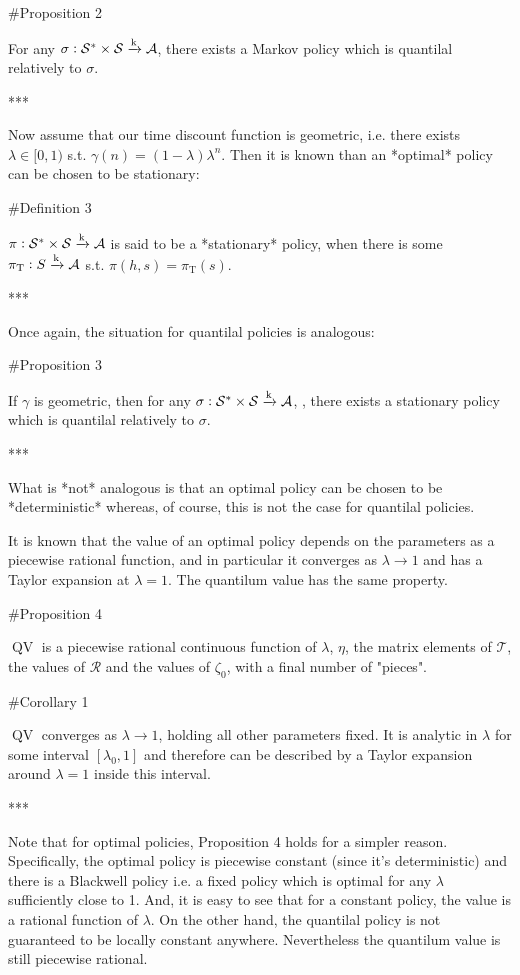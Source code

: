 \documentclass[a4paper]{article}
\newcommand{\AP}[1]{\left(#1\right)}
\newcommand{\AB}[1]{\left[#1\right]}
\newcommand{\K}{\xrightarrow{\textnormal{k}}}
\newcommand{\A}{\mathcal{A}}
\newcommand{\St}{\mathcal{S}}
\newcommand{\T}{\mathcal{T}}
\newcommand{\R}{\mathcal{R}}
\newcommand{\QV}{\operatorname{QV}}
\begin{document}
\#Proposition 2

For any $\sigma: \St^* \times \St \K \A$, there exists a Markov policy which is quantilal relatively to $\sigma$.

***

Now assume that our time discount function is geometric, i.e. there exists $\lambda\in[0,1)$ s.t. $\gamma(n)=(1-\lambda)\lambda^n$. Then it is known than an *optimal* policy can be chosen to be stationary:

\#Definition 3

$\pi: \St^* \times \St \K \A$ is said to be a *stationary* policy, when there is some $\pi_\text{T}: S \K \A$ s.t. $\pi(h,s)=\pi_\text{T}\AP{s}$.

***

Once again, the situation for quantilal policies is analogous:

\#Proposition 3

If $\gamma$ is geometric, then for any $\sigma: \St^* \times \St \K \A$, , there exists a stationary policy which is quantilal relatively to $\sigma$.

***

What is *not* analogous is that an optimal policy can be chosen to be *deterministic* whereas, of course, this is not the case for quantilal policies.

It is known that the value of an optimal policy depends on the parameters as a piecewise rational function, and in particular it converges as $\lambda \rightarrow 1$ and has a Taylor expansion at $\lambda=1$. The quantilum value has the same property.

\#Proposition 4

$\QV$ is a piecewise rational continuous function of $\lambda$, $\eta$, the matrix elements of $\T$, the values of $\R$ and the values of $\zeta_0$, with a final number of "pieces".

\#Corollary 1

$\QV$ converges as $\lambda \rightarrow 1$, holding all other parameters fixed. It is analytic in $\lambda$ for some interval $\AB{\lambda_0,1}$ and therefore can be described by a Taylor expansion around $\lambda=1$ inside this interval.

***

Note that for optimal policies, Proposition 4 holds for a simpler reason. Specifically, the optimal policy is piecewise constant (since it's deterministic) and there is a Blackwell policy i.e. a fixed policy which is optimal for any $\lambda$ sufficiently close to 1. And, it is easy to see that for a constant policy, the value is a rational function of $\lambda$. On the other hand, the quantilal policy is not guaranteed to be locally constant anywhere. Nevertheless the quantilum value is still piecewise rational.
\end{document}
